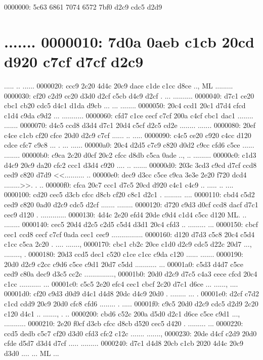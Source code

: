 0000000: 5c63 6861 7074 6572 7bf0 d2c9 cdc5 d2d9  \chapter{.......
0000010: 7d0a 0aeb c1cb 20cd d920 c7cf d7cf d2c9  }..... .. ......
0000020: ccc9 2c20 4d4c 20c9 dace c1de c1cc d8ce  .., ML .........
0000030: cf20 c2d9 cc20 d3d0 d2cf c5cb d4c9 d2cf  . ... ..........
0000040: d7c1 ce20 cbc1 cb20 cdc5 d4c1 d1da d9cb  ... ... ........
0000050: 20c4 ccd1 20c1 d7d4 cfcd c1d4 c9da c9d2   ... ...........
0000060: cfd7 c1ce cecf c7cf 200a c4cf cbc1 dac1  ........ .......
0000070: d4c5 ccd8 d3d4 d7c1 20d4 c5cf d2c5 cd2e  ........ .......
0000080: 20ef c4ce c1cb cf20 cfce 20d0 d2c9 c7cf   ...... .. .....
0000090: c4c5 ce20 c920 c4cc d120 cdce cfc7 c9c8  ... . ... ......
00000a0: 20c4 d2d5 c7c9 c820 d0d2 c9cc cfd6 c5ce   ...... ........
00000b0: c9ca 2c20 d0cf 20c2 cfcc d8db c5ca 0ade  .., .. .........
00000c0: c1d3 d4c9 20c9 da20 cfc2 ccc1 d3d4 c920  .... .. ....... 
00000d0: 203c 3cd3 c9cd d7cf ccd8 ced9 c820 d7d9   <<.......... ..
00000e0: dec9 d3cc c5ce c9ca 3e3e 2e20 f720 dcd4  ........>>. . ..
00000f0: cfca 20c7 ccc1 d7c5 20cd d920 c4c1 c4c9  .. ..... .. ....
0000100: cd20 cec5 d3cb cfcc d8cb cf20 c8c1 d2c1  . ......... ....
0000110: cbd4 c5d2 ced9 c820 0ad0 d2c9 cdc5 d2cf  ....... ........
0000120: d720 c9d3 d0cf ccd8 dacf d7c1 cec9 d120  . ............. 
0000130: 4d4c 2e20 efd4 20de c9d4 c1d4 c5cc d120  ML. .. ........ 
0000140: cec5 20d4 d2c5 c2d5 c5d4 d3d1 20c4 cfd3  .. ......... ...
0000150: cbcf cec1 ccd8 cecf c7cf 0ada cec1 cec9  ................
0000160: d120 d7d3 c5c8 20c4 c5d4 c1cc c5ca 2c20  . .... ......., 
0000170: cbc1 cb2c 20ce c1d0 d2c9 cdc5 d22c 20d7  ..., ........, .
0000180: 20d3 ccd5 dec1 c520 c1ce c1cc c9da c120   ...... ....... 
0000190: 20d0 d2c9 c2cc c9d6 c5ce c9d1 20d7 c5dd   ........... ...
00001a0: c5d3 d4d7 c5ce ced9 c80a dec9 d3c5 cc2c  ...............,
00001b0: 20d0 d2c9 d7c5 c4a3 cece cfcd 20c4 c1cc   ........... ...
00001c0: c5c5 2e20 efc4 cec1 cbcf 2c20 d7c1 d6ce  ... ......, ....
00001d0: cf20 c9d3 d0d9 d4c1 d4d8 20dc d4c9 20d0  . ........ ... .
00001e0: d2cf c7d2 c1cd cdd9 20c9 20d0 cfc8 cfd6  ........ . .....
00001f0: c9c5 20d0 d2c9 cdc5 d2d9 2c20 c120 d4c1  .. ......., . ..
0000200: cbd6 c52c 200a d5d0 d2c1 d6ce c5ce c9d1  ..., ...........
0000210: 2e20 f0cf d3cb cfcc d8cb d520 cec5 d420  . ......... ... 
0000220: ccd5 dedb c5c7 cf20 d3d0 cfd3 cfc2 c12c  ....... .......,
0000230: 20de d4cf c2d9 20d0 cfde d5d7 d3d4 d7cf   ..... .........
0000240: d7c1 d4d8 20cb c1cb 2020 4d4c 20c9 d3d0  .... ...  ML ...
